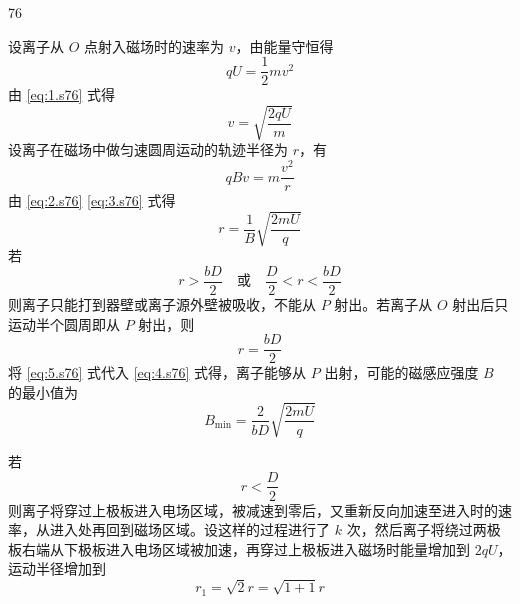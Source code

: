 \begin{solution}{76}
    \begin{subsolution}
        设离子从 $O$ 点射入磁场时的速率为 $v$，由能量守恒得
        \begin{equation}
            q U = \frac{1}{2} m v^{2}
            \label{eq:1.s76}
        \end{equation}
        由 \eqref{eq:1.s76} 式得
        \begin{equation}
            v = \sqrt{\frac{2 q U}{m}}
            \label{eq:2.s76}
        \end{equation}
        设离子在磁场中做匀速圆周运动的轨迹半径为 $r$，有
        \begin{equation}
            q B v = m \frac{v^{2}}{r}
            \label{eq:3.s76}
        \end{equation}
        由 \eqref{eq:2.s76} \eqref{eq:3.s76} 式得
        \begin{equation}
            r = \frac{1}{B} \sqrt{\frac{2 m U}{q}}
            \label{eq:4.s76}
        \end{equation}
        若
        \begin{equation}
            r > \frac{b D}{2} \quad \text{或} \quad \frac{D}{2} < r < \frac{b D}{2}
        \end{equation}
        则离子只能打到器壁或离子源外壁被吸收，不能从 $P$ 射出。若离子从 $O$ 射出后只运动半个圆周即从 $P$ 射出，则
        \begin{equation}
            r = \frac{b D}{2}
            \label{eq:5.s76}
        \end{equation}
        将 \eqref{eq:5.s76} 式代入 \eqref{eq:4.s76} 式得，离子能够从 $P$ 出射，可能的磁感应强度 $B$ 的最小值为
        \begin{equation}
            B_{\min} = \frac{2}{b D} \sqrt{\frac{2 m U}{q}}
            \label{eq:6.s76}
        \end{equation}
    \end{subsolution}
    \begin{subsolution}
        若
        \begin{equation}
            r < \frac{D}{2}
        \end{equation}
        则离子将穿过上极板进入电场区域，被减速到零后，又重新反向加速至进入时的速率，从进入处再回到磁场区域。设这样的过程进行了 $k$ 次，然后离子将绕过两极板右端从下极板进入电场区域被加速，再穿过上极板进入磁场时能量增加到 $2qU$，运动半径增加到
        \begin{equation}
            r_{1} = \sqrt{2} r = \sqrt{1 + 1} r

\end{equation}
\end{subsolution}
\end{solution}
